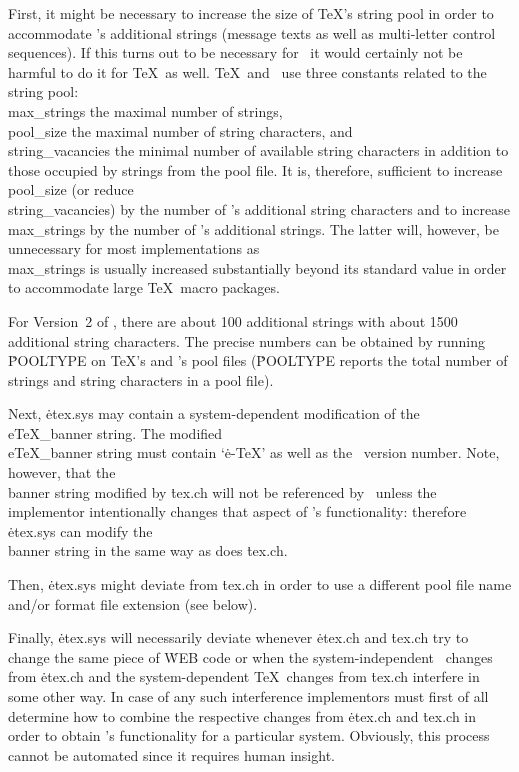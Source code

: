 First, it might be necessary to increase the size of \TeX's string pool
in order to accommodate \eTeX's additional strings (message texts as
well as multi-letter control sequences).  If this turns out to be
necessary for \eTeX\ it would certainly not be harmful to do it for
\TeX\ as well.  \TeX\ and \eTeX\ use three constants related to the
string pool:  \\{max\_strings} the maximal number of strings,
\\{pool\_size} the maximal number of string characters, and
\\{string\_vacancies} the minimal number of available string characters
in addition to those occupied by strings from the pool file.  It is,
therefore, sufficient to increase \\{pool\_size} (or reduce
\\{string\_vacancies}) by the number of \eTeX's additional string
characters and to increase \\{max\_strings} by the number of \eTeX's
additional strings.  The latter will, however, be unnecessary for most
implementations as \\{max\_strings} is usually increased substantially
beyond its standard value in order to accommodate large \TeX\ macro
packages.

For Version~2 of \eTeX, there are about 100 additional strings with
about 1500 additional string characters.  The precise numbers can be
obtained by running \.{POOLTYPE} on \TeX's and \eTeX's pool files
(\.{POOLTYPE} reports the total number of strings and string characters
in a pool file).

Next, \.{etex.sys} may contain a system-dependent modification of the
\\{eTeX\_banner} string.  The modified \\{eTeX\_banner} string must
contain `\.{e-TeX}' as well as the \eTeX\ version number.  Note,
however, that the \\{banner} string modified by \.{tex.ch} will not be
referenced by \eTeX\ unless the implementor intentionally changes that
aspect of \eTeX's functionality:  therefore \.{etex.sys} can modify the
\\{banner} string in the same way as does \.{tex.ch}.

Then, \.{etex.sys} might deviate from \.{tex.ch} in order to use a
different pool file name and\slash or format file extension (see below).

Finally, \.{etex.sys} will necessarily deviate whenever \.{etex.ch}
and \.{tex.ch} try to change the same piece of \.{WEB} code or when the
system-independent \eTeX\ changes from \.{etex.ch} and the
system-dependent \TeX\ changes from \.{tex.ch} interfere in some other way. 
In case of any such interference implementors must first of all determine
how to combine the respective changes from \.{etex.ch} and \.{tex.ch}
in order to obtain \eTeX's functionality for a particular system.
Obviously, this process cannot be automated since it requires human
insight.

